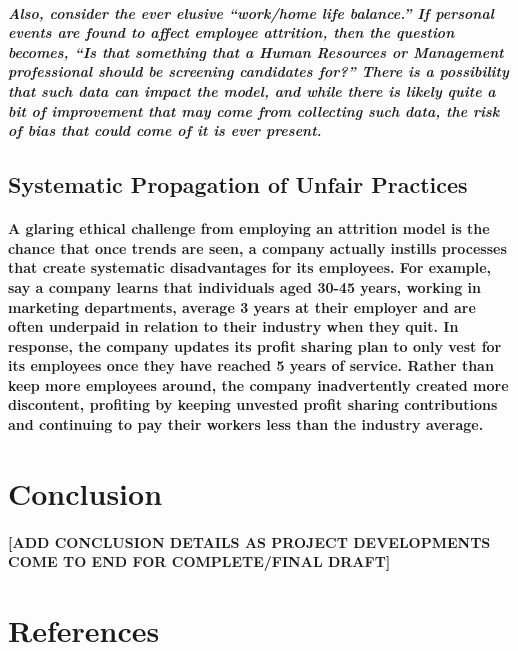 \documentclass{article}
\begin{document}
\subparagraph{Also, consider the ever elusive “work/home life balance.” If personal events are found to affect employee attrition, then the question becomes, “Is that something that a Human Resources or Management professional should be screening candidates for?” There is a possibility that such data can impact the model, and while there is likely quite a bit of improvement that may come from collecting such data, the risk of bias that could come of it is ever present.}
 
\subsection{Systematic Propagation of Unfair Practices}

\paragraph{A glaring ethical challenge from employing an attrition model is the chance that once trends are seen, a company actually instills processes that create systematic disadvantages for its employees. For example, say a company learns that individuals aged 30-45 years, working in marketing departments, average 3 years at their employer and are often underpaid in relation to their industry when they quit. In response, the company updates its profit sharing plan to only vest for its employees once they have reached 5 years of service. Rather than keep more employees around, the company inadvertently created more discontent, profiting by keeping unvested profit sharing contributions and continuing to pay their workers less than the industry average.}

\section{Conclusion}

\paragraph{[ADD CONCLUSION DETAILS AS PROJECT DEVELOPMENTS COME TO END FOR COMPLETE/FINAL DRAFT]}
 
\section{References}

\printbibliography
\end{document}
